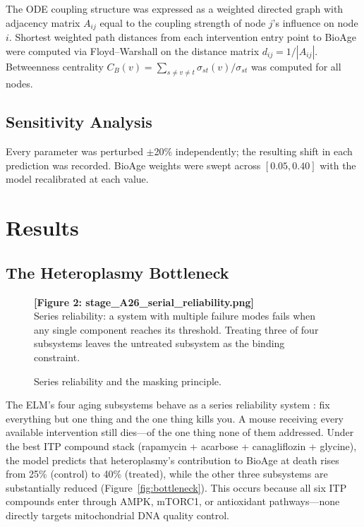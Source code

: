 \documentclass[11pt]{article}
\begin{document}
The ODE coupling structure was expressed as a weighted directed graph with adjacency matrix $A_{ij}$ equal to the coupling strength of node $j$'s influence on node $i$. Shortest weighted path distances from each intervention entry point to BioAge were computed via Floyd--Warshall on the distance matrix $d_{ij} = 1/|A_{ij}|$. Betweenness centrality $C_B(v) = \sum_{s \neq v \neq t} \sigma_{st}(v)/\sigma_{st}$ was computed for all nodes.

\subsection{Sensitivity Analysis}

Every parameter was perturbed $\pm$20\% independently; the resulting shift in each prediction was recorded. BioAge weights were swept across $[0.05, 0.40]$ with the model recalibrated at each value.

\section{Results}

\subsection{The Heteroplasmy Bottleneck}

\begin{figure}[ht]
\centering
\textbf{[Figure 2: stage\_A26\_serial\_reliability.png]}\\[4pt]
\small Series reliability: a system with multiple failure modes fails when any single component reaches its threshold. Treating three of four subsystems leaves the untreated subsystem as the binding constraint.
\caption{Series reliability and the masking principle.}
\label{fig:reliability}
\end{figure}

The ELM's four aging subsystems behave as a series reliability system \citep{Gavrilov2001}: fix everything but one thing and the one thing kills you. A mouse receiving every available intervention still dies---of the one thing none of them addressed. Under the best ITP compound stack (rapamycin + acarbose + canagliflozin + glycine), the model predicts that heteroplasmy's contribution to BioAge at death rises from 25\% (control) to 40\% (treated), while the other three subsystems are substantially reduced (Figure~\ref{fig:bottleneck}). This occurs because all six ITP compounds enter through AMPK, mTORC1, or antioxidant pathways---none directly targets mitochondrial DNA quality control.
\end{document}
